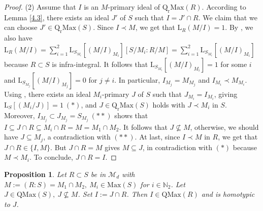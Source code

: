 \documentclass[12pt,leqno]{amsart}
\newtheorem{proposition}[theorem]{Proposition}
\theoremstyle{definition}
\begin{document}
\begin{proof}
(2) Assume that $I$ is an $M$-primary ideal of $\mathrm{Q_rMax}(R)$. According to Lemma \ref{4.3}, there exists an ideal $J'$ of $ S$ such that $ I=J'\cap R$. We claim that we can choose $J'\in\mathrm{Q_rMax}(S)$. Since $I\prec M$, we get that $\mathrm{L}_R(M/I)=1$. By \cite[Theorem 13, p. 168]{N}, we also have $\mathrm{L}_R(M/I)=\sum_{i=1}^2\mathrm{L}_{S_{M_i}}[(M/I)_{M_i}][S/M_i:R/M]=\sum_{i=1}^2\mathrm{L}_{S_{M_i}}[(M/I)_{M_i}]$ because $R\subset S$ is infra-integral. It follows that $\mathrm {L}_{S_{M_i}}[(M/I)_{M_i}]=1$ for some $i$ and $\mathrm{L}_{S_{M_j}}[(M/I)_{M_j}]=0$ for $j\neq i$. In particular, $I_{M_j}=M_{M_j}$ and $I_{M_i}\prec M_{M_i}$. Using \cite[Corollary 2, p. 225]{ZS},  there exists an ideal $ M_i$-primary $J$ of $S$ such that $J_{M_i}=I_{M_i}$, giving $\mathrm{L}_ S[(M_i/J)]=1\ (*)$, and $J\in\mathrm{Q_rMax}(S)$ holds with $J\prec M_i$ in $S$. Moreover, $I_{M_j}\subset J_{M_j}=S_{M_ j}\ (**)$ shows that $I\subseteq J\cap R\subseteq M_i\cap R=M=M_1\cap M_2$. It follows that $J\not\subseteq M$, otherwise, we should have $J\subseteq M_j$, a contradiction with $(**)$. At last, since $I\prec M$ in $R$, we get that $J\cap R\in\{I,M\}$. But $J\cap R=M$ gives $M\subseteq J$, in contradiction with $(*)$ because $M\prec M_i$. To conclude, $J\cap R=I$. 
 \end{proof}
 
\begin{proposition}\label{4.12} Let $R\subset S$ be in $\mathcal M_d$ with $M:=(R:S)=M_1\cap M_2,\ M_i\in\mathrm{Max}(S)$ for $i\in\mathbb N_2$. Let $J\in\mathrm{QMax}(S),\ J\not\subseteq M$. Set $I:=J\cap R$. Then $I\in\mathrm{QMax}(R)$ and is homotypic to $J$.
\end{proposition}
\end{document}
